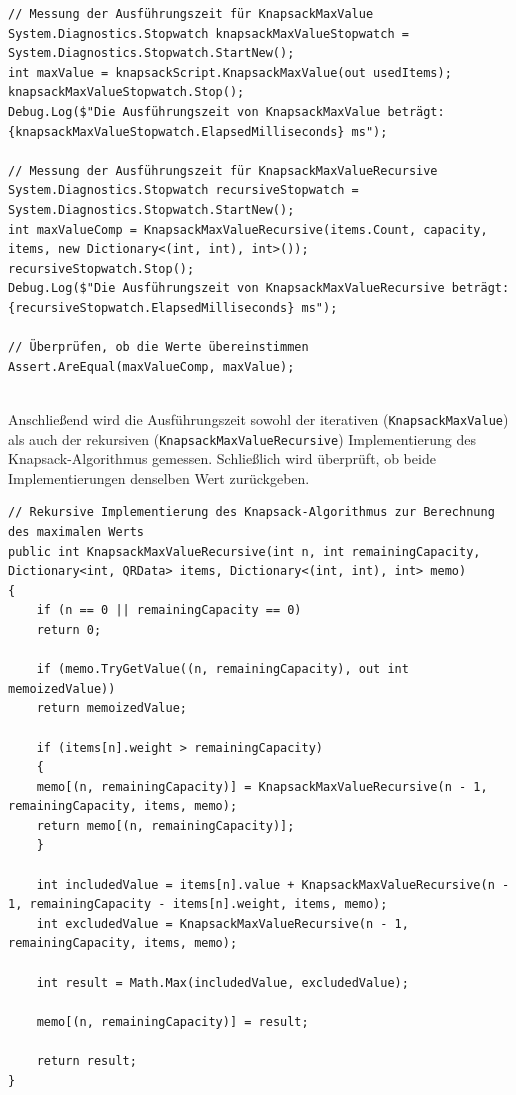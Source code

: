 \begin{lstlisting}[style=csharp, caption={Zeitmessung}, label=code:Zeitmessung]
// Messung der Ausführungszeit für KnapsackMaxValue
System.Diagnostics.Stopwatch knapsackMaxValueStopwatch = System.Diagnostics.Stopwatch.StartNew();
int maxValue = knapsackScript.KnapsackMaxValue(out usedItems);
knapsackMaxValueStopwatch.Stop();
Debug.Log($"Die Ausführungszeit von KnapsackMaxValue beträgt: {knapsackMaxValueStopwatch.ElapsedMilliseconds} ms");

// Messung der Ausführungszeit für KnapsackMaxValueRecursive
System.Diagnostics.Stopwatch recursiveStopwatch = System.Diagnostics.Stopwatch.StartNew();
int maxValueComp = KnapsackMaxValueRecursive(items.Count, capacity, items, new Dictionary<(int, int), int>());
recursiveStopwatch.Stop();
Debug.Log($"Die Ausführungszeit von KnapsackMaxValueRecursive beträgt: {recursiveStopwatch.ElapsedMilliseconds} ms");

// Überprüfen, ob die Werte übereinstimmen
Assert.AreEqual(maxValueComp, maxValue);
\end{lstlisting}\\

Anschließend wird die Ausführungszeit sowohl der iterativen (\texttt{KnapsackMaxValue}) als auch der rekursiven
(\texttt{KnapsackMaxValueRecursive}) Implementierung des Knapsack-Algorithmus gemessen. Schließlich wird überprüft,
ob beide Implementierungen denselben Wert zurückgeben.

\newpage

\begin{lstlisting}[style=csharp, caption={Rekursiver Algorithmus}, label=code:Rekursiver Algorithmus]
// Rekursive Implementierung des Knapsack-Algorithmus zur Berechnung des maximalen Werts
public int KnapsackMaxValueRecursive(int n, int remainingCapacity, Dictionary<int, QRData> items, Dictionary<(int, int), int> memo)
{
    if (n == 0 || remainingCapacity == 0)
    return 0;

    if (memo.TryGetValue((n, remainingCapacity), out int memoizedValue))
    return memoizedValue;

    if (items[n].weight > remainingCapacity)
    {
    memo[(n, remainingCapacity)] = KnapsackMaxValueRecursive(n - 1, remainingCapacity, items, memo);
    return memo[(n, remainingCapacity)];
    }

    int includedValue = items[n].value + KnapsackMaxValueRecursive(n - 1, remainingCapacity - items[n].weight, items, memo);
    int excludedValue = KnapsackMaxValueRecursive(n - 1, remainingCapacity, items, memo);

    int result = Math.Max(includedValue, excludedValue);

    memo[(n, remainingCapacity)] = result;

    return result;
}
\end{lstlisting}\\

